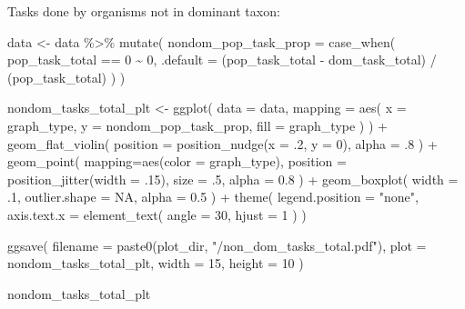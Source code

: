 \documentclass[
]{book}
\newenvironment{Shaded}{\begin{snugshade}}{\end{snugshade}}
\newcommand{\AttributeTok}[1]{\textcolor[rgb]{0.77,0.63,0.00}{#1}}
\newcommand{\ConstantTok}[1]{\textcolor[rgb]{0.00,0.00,0.00}{#1}}
\newcommand{\DecValTok}[1]{\textcolor[rgb]{0.00,0.00,0.81}{#1}}
\newcommand{\FloatTok}[1]{\textcolor[rgb]{0.00,0.00,0.81}{#1}}
\newcommand{\FunctionTok}[1]{\textcolor[rgb]{0.00,0.00,0.00}{#1}}
\newcommand{\NormalTok}[1]{#1}
\newcommand{\OtherTok}[1]{\textcolor[rgb]{0.56,0.35,0.01}{#1}}
\newcommand{\SpecialCharTok}[1]{\textcolor[rgb]{0.00,0.00,0.00}{#1}}
\newcommand{\StringTok}[1]{\textcolor[rgb]{0.31,0.60,0.02}{#1}}
\begin{document}
Tasks done by organisms not in dominant taxon:

\begin{Shaded}
\begin{Highlighting}[]
\NormalTok{data }\OtherTok{\textless{}{-}}\NormalTok{ data }\SpecialCharTok{\%\textgreater{}\%}
  \FunctionTok{mutate}\NormalTok{(}
    \AttributeTok{nondom\_pop\_task\_prop =} \FunctionTok{case\_when}\NormalTok{(}
\NormalTok{      pop\_task\_total }\SpecialCharTok{==} \DecValTok{0} \SpecialCharTok{\textasciitilde{}} \DecValTok{0}\NormalTok{,}
      \AttributeTok{.default =}\NormalTok{ (pop\_task\_total }\SpecialCharTok{{-}}\NormalTok{ dom\_task\_total) }\SpecialCharTok{/}\NormalTok{ (pop\_task\_total)}
\NormalTok{    )}
\NormalTok{  )}

\NormalTok{nondom\_tasks\_total\_plt }\OtherTok{\textless{}{-}} \FunctionTok{ggplot}\NormalTok{(}
    \AttributeTok{data =}\NormalTok{ data,}
    \AttributeTok{mapping =} \FunctionTok{aes}\NormalTok{(}
      \AttributeTok{x =}\NormalTok{ graph\_type,}
      \AttributeTok{y =}\NormalTok{ nondom\_pop\_task\_prop,}
      \AttributeTok{fill =}\NormalTok{ graph\_type}
\NormalTok{    )}
\NormalTok{  ) }\SpecialCharTok{+}
  \FunctionTok{geom\_flat\_violin}\NormalTok{(}
    \AttributeTok{position =} \FunctionTok{position\_nudge}\NormalTok{(}\AttributeTok{x =}\NormalTok{ .}\DecValTok{2}\NormalTok{, }\AttributeTok{y =} \DecValTok{0}\NormalTok{),}
    \AttributeTok{alpha =}\NormalTok{ .}\DecValTok{8}
\NormalTok{  ) }\SpecialCharTok{+}
  \FunctionTok{geom\_point}\NormalTok{(}
    \AttributeTok{mapping=}\FunctionTok{aes}\NormalTok{(}\AttributeTok{color =}\NormalTok{ graph\_type),}
    \AttributeTok{position =} \FunctionTok{position\_jitter}\NormalTok{(}\AttributeTok{width =}\NormalTok{ .}\DecValTok{15}\NormalTok{),}
    \AttributeTok{size =}\NormalTok{ .}\DecValTok{5}\NormalTok{,}
    \AttributeTok{alpha =} \FloatTok{0.8}
\NormalTok{  ) }\SpecialCharTok{+}
  \FunctionTok{geom\_boxplot}\NormalTok{(}
    \AttributeTok{width =}\NormalTok{ .}\DecValTok{1}\NormalTok{,}
    \AttributeTok{outlier.shape =} \ConstantTok{NA}\NormalTok{,}
    \AttributeTok{alpha =} \FloatTok{0.5}
\NormalTok{  ) }\SpecialCharTok{+}
  \FunctionTok{theme}\NormalTok{(}
    \AttributeTok{legend.position =} \StringTok{"none"}\NormalTok{,}
    \AttributeTok{axis.text.x =} \FunctionTok{element\_text}\NormalTok{(}
      \AttributeTok{angle =} \DecValTok{30}\NormalTok{,}
      \AttributeTok{hjust =} \DecValTok{1}
\NormalTok{    )}
\NormalTok{  )}

\FunctionTok{ggsave}\NormalTok{(}
  \AttributeTok{filename =} \FunctionTok{paste0}\NormalTok{(plot\_dir, }\StringTok{"/non\_dom\_tasks\_total.pdf"}\NormalTok{),}
  \AttributeTok{plot =}\NormalTok{ nondom\_tasks\_total\_plt,}
  \AttributeTok{width =} \DecValTok{15}\NormalTok{,}
  \AttributeTok{height =} \DecValTok{10}
\NormalTok{)}

\NormalTok{nondom\_tasks\_total\_plt}
\end{Highlighting}
\end{Shaded}
\end{document}
